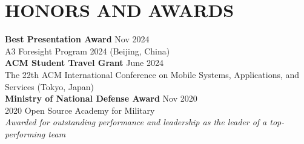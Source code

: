 \section*{HONORS AND AWARDS}

\noindent
\textbf{Best Presentation Award} \hfill Nov 2024 \\
A3 Foresight Program 2024 (Beijing, China) \\

\noindent
\textbf{ACM Student Travel Grant} \hfill June 2024 \\
The 22th ACM International Conference on Mobile Systems, Applications, and Services (Tokyo, Japan) \\

\noindent
\textbf{Ministry of National Defense Award} \hfill Nov 2020 \\
2020 Open Source Academy for Military \\
\textit{Awarded for outstanding performance and leadership as the leader of a top-performing team} \\